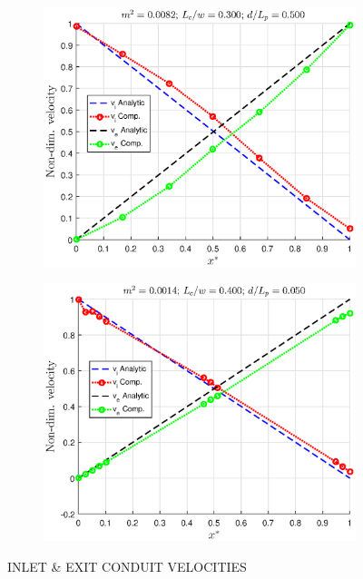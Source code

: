 \documentclass[twocolumn,10pt,cleanfoot]{ihmtc}
\begin{document}
\begin{figure}
\centering
   \begin{subfigure}[b]{0.55\textwidth}
   \includegraphics[height=0.55\linewidth,width=0.90\linewidth]{velvalid_a.eps}
    \caption{} 
   \label{velvalid_a} 
\end{subfigure}
%
%
%
   \begin{subfigure}[b]{0.55\textwidth}
   \includegraphics[height=0.55\linewidth,width=0.90\linewidth]{velvalid_c.eps}
   \caption{}
   \label{velvalid_c} 
\end{subfigure}
%
\caption{INLET \& EXIT CONDUIT VELOCITIES}
\vspace{-3em}
\end{figure}
%
%
\end{document}
